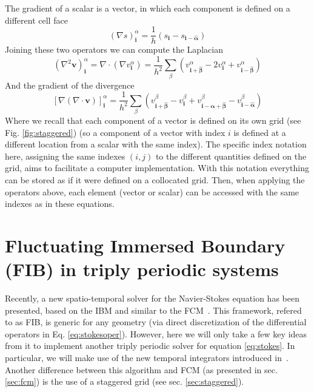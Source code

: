 \documentclass[twoside,openright,titlepage,numbers=noenddot,%
headinclude,footinclude,cleardoublepage=empty,abstract=on,
BCOR=5mm,fontsize=11pt, dvipsnames, paper=b5
]{scrreprt}
\renewcommand{\vec}[1]{\bm{#1}}
\begin{document}
The gradient of a scalar is a vector, in which each component is defined on a different cell face
\begin{equation}
  \label{eq:staggeredgrad}
  (\nabla s)^\alpha_{\vec{i}} = \frac{1}{h}(s_{\vec{i}} - s_{\vec{i}- \vec{\hat{\alpha}}})
\end{equation}
Joining these two operators we can compute the Laplacian
\begin{equation}
  (\nabla^2\vec{v})^\alpha_{\vec{i}} = \nabla\cdot(\nabla v_{\vec{i}}^\alpha) = \frac{1}{h^2}\sum_\beta\left(v^\alpha_{\vec{i} +\vec{\hat{\beta}}}  - 2v^\alpha_{\vec{i}} + v^\alpha_{\vec{i} -\vec{\hat{\beta}}} \right)
\end{equation}
And the gradient of the divergence
\begin{equation}
  \label{eq:staggeredlap}
\left[\nabla(\nabla\cdot \vec{v})\right]^\alpha_{\vec{i}} = \frac{1}{h^2}\sum_\beta\left(v^\beta_{\vec{i} +\vec{\hat{\beta}}}  - v^\beta_{\vec{i}} + v^\beta_{\vec{i} -\vec{\hat{\alpha}} + \vec{\hat{\beta}}} - v^\beta_{\vec{i} -\vec{\hat{\alpha}}}\right)
\end{equation}
Where we recall that each component of a vector is defined on its own grid (see Fig. \ref{fig:staggered}) (so a component of a vector with index $i$ is defined at a different location from a scalar with the same index). The specific index notation here, assigning the same indexes $(i,j)$ to the different quantities defined on the grid, aims to facilitate a computer implementation. With this notation everything can be stored as if it were defined on a collocated grid. Then, when applying the operators above, each element (vector or scalar) can be accessed with the same indexes as in these equations.



\section{Fluctuating Immersed Boundary (FIB) in triply periodic systems}\label{sec:fib}
Recently, a new spatio-temporal solver for the Navier-Stokes equation has been presented, based on the \gls{IBM} and similar to the \gls{FCM}~\cite{Delong2014}. This framework, refered to as \gls{FIB}, is generic for any geometry (via direct discretization of the differential operators in Eq. \eqref{eq:stokesoper}). However, here we will only take a few key ideas from it to implement another triply periodic solver for equation \eqref{eq:stokes}. In particular, we will make use of the new temporal integrators introduced in~\cite{Delong2014}. Another difference between this algorithm and \gls{FCM} (as presented in sec. \ref{sec:fcm}) is the use of a staggered grid (see sec. \ref{sec:staggered}).
\end{document}
